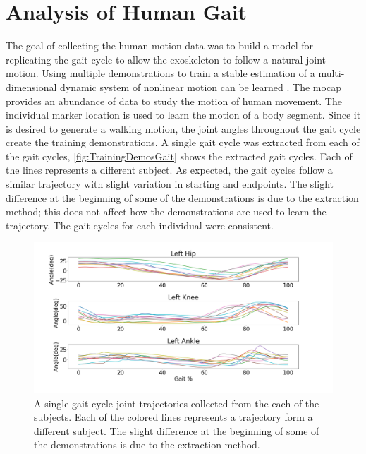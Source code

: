 \section{Analysis of Human Gait}

The goal of collecting the human motion data was to build a model for replicating the gait cycle to allow the exoskeleton to follow a natural joint motion. Using multiple demonstrations to train a stable estimation of a multi-dimensional dynamic system of nonlinear motion can be learned \cite{li2018development}. The mocap provides an abundance of data to study the motion of human movement. The individual marker location is used to learn the motion of a body segment. Since it is desired to generate a walking motion, the joint angles throughout the gait cycle create the training demonstrations. A single gait cycle was extracted from each of the gait cycles,  \autoref{fig:TrainingDemosGait} shows the extracted gait cycles. Each of the lines represents a different subject. As expected, the gait cycles follow a similar trajectory with slight variation in starting and endpoints. The slight difference at the beginning of some of the demonstrations is due to the extraction method; this does not affect how the demonstrations are used to learn the trajectory. The gait cycles for each individual were consistent.

\begin{figure}[h]
    \centering
    \includegraphics[scale=0.30]{images/gait_data/gaittraining.png}
    \caption[Raw Joint Trajectories Collected from the Subjects]{A single gait cycle joint trajectories collected from the each of the subjects. Each of the colored lines represents a trajectory form a different subject. The slight difference at the beginning of some of the demonstrations is due to the extraction method.}
    \label{fig:TrainingDemosGait}
\end{figure}

